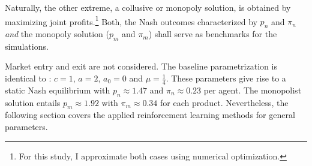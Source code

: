 Naturally, the other extreme, a collusive or monopoly solution, is obtained by maximizing joint profits.\footnote{For this study, I approximate both cases using numerical optimization.} Both, the Nash outcomes characterized by $p_n$ and $\pi_n$ \emph{and} the monopoly solution ($p_m$ and $\pi_m$) shall serve as benchmarks for the simulations.

Market entry and exit are not considered. The baseline parametrization is identical to \textcite{calvano_artificial_2019}:
$c = 1$,
$a = 2$,
$a_0 = 0$ and
$\mu = \frac{1}{4}$. These parameters give rise to a static Nash equilibrium with $p_n \approx 1.47$ and $\pi_n \approx 0.23$ per agent. The monopolist solution entails $p_m \approx 1.92$ with $\pi_m \approx 0.34$ for each product. Nevertheless, the following section covers the applied reinforcement learning methods for general parameters.

